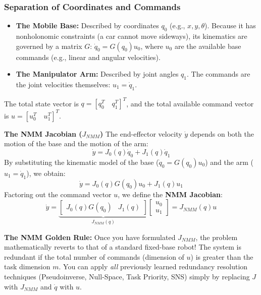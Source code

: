 \documentclass[11pt,a4paper]{article}
\begin{document}
\subsubsection{Separation of Coordinates and Commands}
\begin{itemize}
    \item \textbf{The Mobile Base:} Described by coordinates $q_0$ (e.g., $x,y,\theta$). Because it has nonholonomic constraints (a car cannot move sideways), its kinematics are governed by a matrix $G$: $\dot{q}_0 = G(q_0)u_0$, where $u_0$ are the available base commands (e.g., linear and angular velocities).
    \item \textbf{The Manipulator Arm:} Described by joint angles $q_1$. The commands are the joint velocities themselves: $u_1 = \dot{q}_1$.
\end{itemize}
The total state vector is $q = [q_0^T \quad q_1^T]^T$, and the total available command vector is $u = [u_0^T \quad u_1^T]^T$.

\textbf{The NMM Jacobian ($J_{NMM}$)}
The end-effector velocity $\dot{y}$ depends on both the motion of the base and the motion of the arm:
$$ \dot{y} = J_0(q)\dot{q}_0 + J_1(q)\dot{q}_1 $$
By substituting the kinematic model of the base ($\dot{q}_0 = G(q_0)u_0$) and the arm ($u_1 = \dot{q}_1$), we obtain:
$$ \dot{y} = J_0(q)G(q_0)u_0 + J_1(q)u_1 $$
Factoring out the command vector $u$, we define the \textbf{NMM Jacobian}:
\begin{equation}
    \dot{y} = \underbrace{\begin{bmatrix} J_0(q)G(q_0) & J_1(q) \end{bmatrix}}_{J_{NMM}(q)} \begin{bmatrix} u_0 \\ u_1 \end{bmatrix} = J_{NMM}(q) u
\end{equation}
 

\begin{examtip}
\textbf{The NMM Golden Rule:} Once you have formulated $J_{NMM}$, the problem mathematically reverts to that of a standard fixed-base robot! 
The system is redundant if the total number of commands (dimension of $u$) is greater than the task dimension $m$. You can apply \textit{all} previously learned redundancy resolution techniques (Pseudoinverse, Null-Space, Task Priority, SNS) simply by replacing $J$ with $J_{NMM}$ and $\dot{q}$ with $u$.
\end{examtip}

\end{document}
